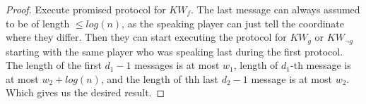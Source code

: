 \begin{proof}
    Execute promised protocol for $KW_f$. The last message can always assumed to be of length $\leq log(n)$, as the speaking player can just tell the coordinate where they differ. Then they can start executing the protocol for $KW_g$ or $KW_{\neg g}$ starting with the same player who was speaking last during the first protocol. The length of the first $d_1-1$ messages is at most $w_1$, length of $d_1$-th message is at most $w_2+log(n)$, and the length of thh last $d_2-1$ message is at most $w_2$. Which gives us the desired result.
\end{proof}


